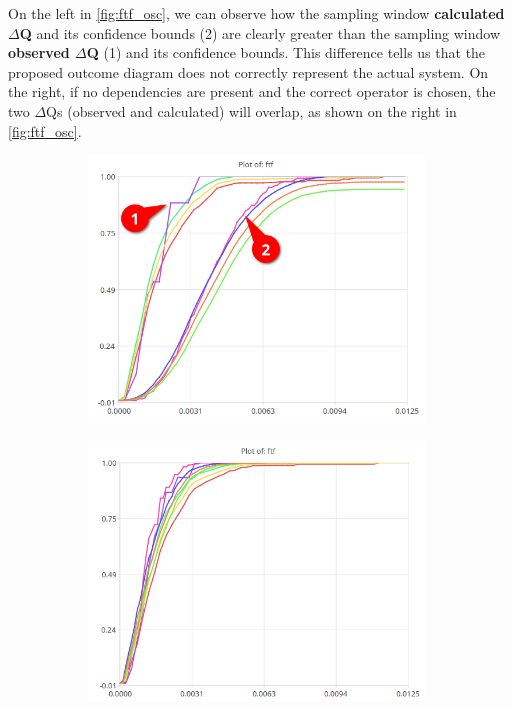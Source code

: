             On the left in \cref{fig:ftf_osc}, we can observe how the sampling window \textbf{calculated $\Delta$Q} and its confidence bounds (2) are clearly greater than the sampling window \textbf{observed $\Delta$Q} (1) and its confidence bounds. This difference tells us that the proposed outcome diagram does not correctly represent the actual system. On the right, if no dependencies are present and the correct operator is chosen, the two $\Delta$Qs (observed and calculated) will overlap, as shown on the right in \cref{fig:ftf_osc}.
            \begin{figure}[H]
                \centering
                \begin{subfigure}{.5\textwidth}
                    \centering
                    \includegraphics[width =0.98\textwidth]{img/bad1.png}
                    \label{fig:bad}
                \end{subfigure}%
                \begin{subfigure}{.5\textwidth}%
                    \centering%
                    \includegraphics[width =0.98\textwidth]{img/good.png}%

\end{subfigure}
\end{figure}
